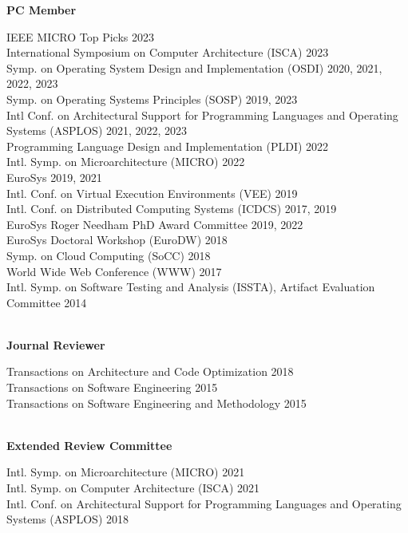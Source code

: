 \documentclass[10pt]{article}
\newcommand{\mysub}[3]{\textbf{#1} {#2} \hfill {\em #3}}
\newcommand{\myssub}[1]{\hspace*{2mm}\parbox{163mm}{#1}\vspace*{2mm}}
\begin{document}
\mysub{PC Member}{}{}\\
\myssub{\vspace{2mm}
  IEEE MICRO Top Picks \hfill 2023 \\
  International Symposium on Computer Architecture (ISCA) \hfill 2023 \\
  Symp. on Operating System Design and Implementation (OSDI) \hfill 2020, 2021, 2022, 2023 \\
  Symp. on Operating Systems Principles (SOSP) \hfill 2019, 2023 \\
  Intl Conf. on Architectural Support for Programming Languages and Operating Systems (ASPLOS) \hfill 2021, 2022, 2023 \\
  Programming Language Design and Implementation (PLDI) \hfill 2022 \\
  Intl. Symp. on Microarchitecture (MICRO) \hfill 2022 \\
  EuroSys \hfill 2019, 2021 \\
  Intl. Conf. on Virtual Execution Environments (VEE) \hfill 2019 \\
  Intl. Conf. on Distributed Computing Systems (ICDCS) \hfill 2017, 2019 \\
  EuroSys Roger Needham PhD Award Committee \hfill 2019, 2022 \\  
  EuroSys Doctoral Workshop (EuroDW) \hfill 2018 \\
  Symp. on Cloud Computing (SoCC) \hfill 2018 \\
  World Wide Web Conference (WWW) \hfill 2017 \\
  Intl. Symp. on Software Testing and Analysis (ISSTA), Artifact Evaluation Committee \hfill 2014 \\
}\\

\mysub{Journal Reviewer}{}{} \\
\myssub{\vspace{2mm}Transactions on Architecture and Code Optimization \hfill 2018\\
  Transactions on Software Engineering \hfill 2015 \\
  Transactions on Software Engineering and Methodology \hfill 2015} \\

\mysub{Extended Review Committee}{}{}\\
\myssub{\vspace{2mm}
  Intl. Symp. on Microarchitecture (MICRO) \hfill 2021 \\
  Intl. Symp. on Computer Architecture (ISCA) \hfill 2021 \\
  Intl. Conf. on Architectural Support for Programming Languages and Operating Systems (ASPLOS) \hfill 2018 \\
}\\
\end{document}

